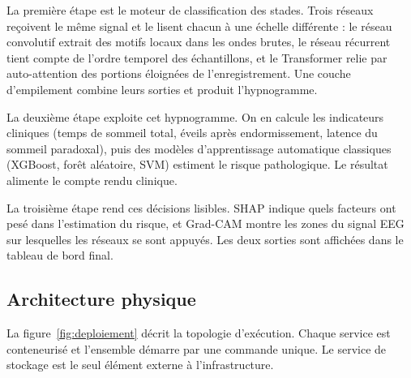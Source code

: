 La première étape est le moteur de classification des stades. Trois réseaux reçoivent
le même signal et le lisent chacun à une échelle différente : le réseau convolutif
extrait des motifs locaux dans les ondes brutes, le réseau récurrent tient compte de
l'ordre temporel des échantillons, et le Transformer relie par auto-attention des
portions éloignées de l'enregistrement. Une couche d'empilement combine leurs sorties
et produit l'hypnogramme.

La deuxième étape exploite cet hypnogramme. On en calcule les indicateurs cliniques
(temps de sommeil total, éveils après endormissement, latence du sommeil paradoxal),
puis des modèles d'apprentissage automatique classiques (XGBoost, forêt aléatoire,
SVM) estiment le risque pathologique. Le résultat alimente le compte rendu clinique.

La troisième étape rend ces décisions lisibles. SHAP indique quels facteurs ont pesé
dans l'estimation du risque, et Grad-CAM montre les zones du signal EEG sur lesquelles
les réseaux se sont appuyés. Les deux sorties sont affichées dans le tableau de bord
final.

\subsection{Architecture physique}

La figure~\ref{fig:deploiement} décrit la topologie d'exécution. Chaque service est
conteneurisé et l'ensemble démarre par une commande unique. Le service de stockage est
le seul élément externe à l'infrastructure.

